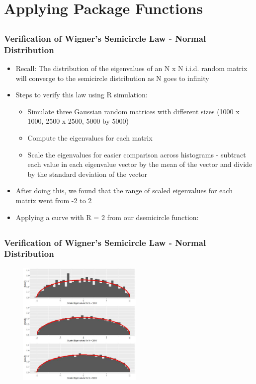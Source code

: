 \documentclass[handout, xcolor=dvipsnames]{beamer}
\begin{document}
\section{Applying Package Functions}  


\subsection{}
\begin{frame}
	\frametitle{Verification of Wigner's Semicircle Law - Normal Distribution} 
    \begin{itemize}
        \item Recall: The distribution of the eigenvalues of an N x N i.i.d. random matrix will converge to the semicircle distribution as N goes to infinity
        \item Steps to verify this law using R simulation:
        \begin{itemize}
            \item Simulate three Gaussian random matrices with different sizes (1000 x 1000, 2500 x 2500, 5000 by 5000)
            \item Compute the eigenvalues for each matrix
            \item Scale the eigenvalues for easier comparison across histograms - subtract each value in each eigenvalue vector by the mean of the vector and divide by the standard deviation of the vector
        \end{itemize}
        \item After doing this, we found that the range of scaled eigenvalues for each matrix went from -2 to 2
        \item Applying a curve with R = 2 from our dsemicircle function:
    \end{itemize}
\end{frame}


\subsection{}
\begin{frame}
	\frametitle{Verification of Wigner's Semicircle Law - Normal Distribution}
        \begin{center}
            \includegraphics[width=8cm,height=6cm]{Figures/SemiLaw.jpeg}
        \end{center}
\end{frame}
\end{document}
